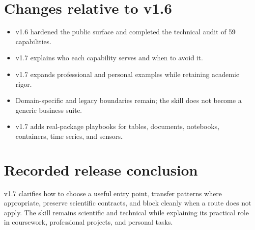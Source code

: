\documentclass[11pt,a4paper]{article}
\begin{document}
\section{Changes relative to v1.6}
\begin{itemize}[leftmargin=1.5em]
\item v1.6 hardened the public surface and completed the technical audit of 59 capabilities.
\item v1.7 explains who each capability serves and when to avoid it.
\item v1.7 expands professional and personal examples while retaining academic rigor.
\item Domain-specific and legacy boundaries remain; the skill does not become a generic business suite.
\item v1.7 adds real-package playbooks for tables, documents, notebooks, containers, time series, and sensors.
\end{itemize}

\section{Recorded release conclusion}
v1.7 clarifies how to choose a useful entry point, transfer patterns where
appropriate, preserve scientific contracts, and block cleanly when a route
does not apply. The skill remains scientific and technical while explaining
its practical role in coursework, professional projects, and personal tasks.
\end{document}
